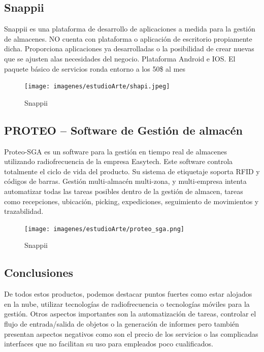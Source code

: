 \documentclass[a4paper,11pt]{book}
\begin{document}
\subsection{Snappii}

Snappii\cite{snp} es una plataforma de desarrollo de aplicaciones a medida para la gestión de almacenes. NO cuenta con plataforma o aplicación de escritorio propiamente dicha. Proporciona aplicaciones ya desarrolladas o la posibilidad de crear nuevas que se ajusten alas necesidades del negocio. Plataforma Android e IOS. El paquete básico de servicios ronda entorno a los 50\$ al mes

\begin{figure}[H]  
\centering 
\texttt{[image: imagenes/estudioArte/shapi.jpeg]}
\caption{Snappii}  
\end{figure}


\subsection{PROTEO – Software de Gestión de almacén}
Proteo-SGA\cite{pro} es un software para la gestión en tiempo real de almacenes utilizando radiofrecuencia de la empresa Easytech\cite{easy}. Este software controla totalmente el ciclo de vida del producto. Su sistema de etiquetaje soporta RFID y códigos de barras. Gestión multi-almacén multi-zona, y multi-empresa intenta automatizar todas las tareas posibles dentro de la gestión de almacen, tareas como recepciones, ubicación, picking, expediciones, seguimiento de movimientos y trazabilidad. 

\begin{figure}[H]  
\centering 
\texttt{[image: imagenes/estudioArte/proteo\_sga.png]}
\caption{Snappii}  
\end{figure}




\subsection{Conclusiones}

De todos estos productos, podemos destacar puntos fuertes como estar alojados en la nube, utilizar tecnologías de radiofrecuencia o tecnologías móviles para la gestión. Otros aspectos importantes son la automatización de tareas, controlar el flujo de entrada/salida de objetos o la generación de informes pero también presentan aspectos negativos como son el precio de los servicios o las complicadas interfaces que no facilitan su uso para empleados poco cualificados. 
\end{document}
